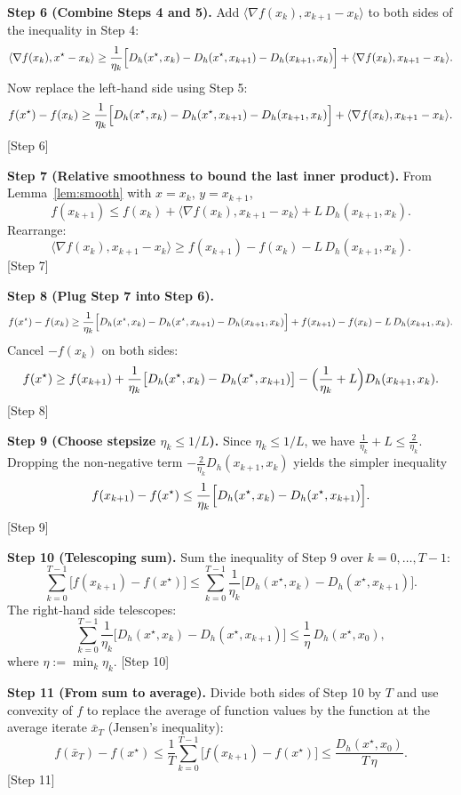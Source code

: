 \documentclass{article}
\newcommand{\Breg}{D_{h}}
\newcommand{\inner}[2]{\langle #1,#2\rangle}
\begin{document}
\noindent\textbf{Step 6 (Combine Steps 4 and 5).}
Add $\inner{\nabla f(x_k)}{x_{k+1}-x_k}$ to both sides of the inequality in Step 4:
\[
\inner{\nabla f(x_k)}{x^{\star}-x_k}
\ge
\frac{1}{\eta_k}\Bigl[\Breg(x^{\star},x_k)-\Breg(x^{\star},x_{k+1})-\Breg(x_{k+1},x_k)\Bigr]
+\inner{\nabla f(x_k)}{x_{k+1}-x_k}.
\]
Now replace the left‑hand side using Step 5:
\[
f(x^{\star})-f(x_k)
\ge
\frac{1}{\eta_k}\Bigl[\Breg(x^{\star},x_k)-\Breg(x^{\star},x_{k+1})-\Breg(x_{k+1},x_k)\Bigr]
+\inner{\nabla f(x_k)}{x_{k+1}-x_k}.
\]
[Step 6]

\noindent\textbf{Step 7 (Relative smoothness to bound the last inner product).}
From Lemma~\ref{lem:smooth} with $x=x_k$, $y=x_{k+1}$,
\[
f(x_{k+1})\le f(x_k)+\inner{\nabla f(x_k)}{x_{k+1}-x_k}+L\,\Breg(x_{k+1},x_k).
\]
Rearrange:
\[
\inner{\nabla f(x_k)}{x_{k+1}-x_k}\ge f(x_{k+1})-f(x_k)-L\,\Breg(x_{k+1},x_k).
\]
[Step 7]

\noindent\textbf{Step 8 (Plug Step 7 into Step 6).}
\[
f(x^{\star})-f(x_k)
\ge
\frac{1}{\eta_k}\Bigl[\Breg(x^{\star},x_k)-\Breg(x^{\star},x_{k+1})-\Breg(x_{k+1},x_k)\Bigr]
+f(x_{k+1})-f(x_k)-L\,\Breg(x_{k+1},x_k).
\]
Cancel $-f(x_k)$ on both sides:
\[
f(x^{\star})\ge f(x_{k+1})+\frac{1}{\eta_k}\bigl[\Breg(x^{\star},x_k)-\Breg(x^{\star},x_{k+1})\bigr]
-\Bigl(\frac{1}{\eta_k}+L\Bigr)\Breg(x_{k+1},x_k).
\]
[Step 8]

\noindent\textbf{Step 9 (Choose stepsize $\eta_k\le 1/L$).}
Since $\eta_k\le 1/L$, we have $\frac{1}{\eta_k}+L\le \frac{2}{\eta_k}$. Dropping the non‑negative term $-\frac{2}{\eta_k}\Breg(x_{k+1},x_k)$ yields the simpler inequality
\[
f(x_{k+1})-f(x^{\star})\le \frac{1}{\eta_k}\Bigl[\Breg(x^{\star},x_k)-\Breg(x^{\star},x_{k+1})\Bigr].
\]
[Step 9]

\noindent\textbf{Step 10 (Telescoping sum).}
Sum the inequality of Step 9 over $k=0,\dots,T-1$:
\[
\sum_{k=0}^{T-1}\bigl[f(x_{k+1})-f(x^{\star})\bigr]
\le
\sum_{k=0}^{T-1}\frac{1}{\eta_k}\bigl[\Breg(x^{\star},x_k)-\Breg(x^{\star},x_{k+1})\bigr].
\]
The right‑hand side telescopes:
\[
\sum_{k=0}^{T-1}\frac{1}{\eta_k}\bigl[\Breg(x^{\star},x_k)-\Breg(x^{\star},x_{k+1})\bigr]
\le
\frac{1}{\eta}\,\Breg(x^{\star},x_0),
\]
where $\eta:=\min_{k}\eta_k$.
[Step 10]

\noindent\textbf{Step 11 (From sum to average).}
Divide both sides of Step 10 by $T$ and use convexity of $f$ to replace the average of function values by the function at the average iterate $\bar x_T$ (Jensen’s inequality):
\[
f(\bar x_T)-f(x^{\star})\le\frac{1}{T}\sum_{k=0}^{T-1}\bigl[f(x_{k+1})-f(x^{\star})\bigr]
\le\frac{\Breg(x^{\star},x_0)}{T\,\eta}.
\]
[Step 11]
\end{document}
